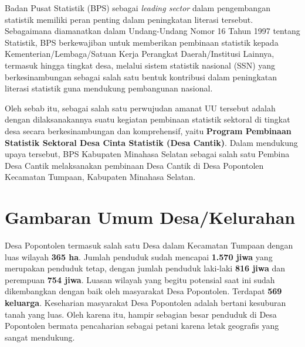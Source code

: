 Badan Pusat Statistik (BPS) sebagai \textit{leading sector} dalam pengembangan statistik memiliki peran penting dalam peningkatan literasi tersebut. Sebagaimana diamanatkan dalam Undang-Undang Nomor 16 Tahun 1997 tentang Statistik, BPS berkewajiban untuk memberikan pembinaan statistik kepada Kementerian/Lembaga/Satuan Kerja Perangkat Daerah/Institusi Lainnya, termasuk hingga tingkat desa, melalui sistem statistik nasional (SSN) yang berkesinambungan sebagai salah satu bentuk kontribusi dalam peningkatan literasi statistik guna mendukung pembangunan nasional.

Oleh sebab itu, sebagai salah satu perwujudan amanat UU tersebut adalah dengan dilaksanakannya suatu kegiatan pembinaan statistik sektoral di tingkat desa secara berkesinambungan dan komprehensif, yaitu \textbf{Program Pembinaan Statistik Sektoral Desa Cinta Statistik (Desa Cantik)}. Dalam mendukung upaya tersebut, BPS Kabupaten Minahasa Selatan sebagai salah satu Pembina Desa Cantik melaksanakan pembinaan Desa Cantik di Desa Popontolen Kecamatan Tumpaan, Kabupaten Minahasa Selatan.

\section{Gambaran Umum Desa/Kelurahan}

Desa Popontolen termasuk salah satu Desa dalam Kecamatan Tumpaan dengan luas wilayah \textbf{365 ha}. Jumlah penduduk sudah mencapai \textbf{1.570 jiwa} yang merupakan penduduk tetap, dengan jumlah penduduk laki-laki \textbf{816 jiwa} dan perempuan \textbf{754 jiwa}. Luasan wilayah yang begitu potensial saat ini sudah dikembangkan dengan baik oleh masyarakat Desa Popontolen. Terdapat \textbf{569 keluarga}. Keseharian masyarakat Desa Popontolen adalah bertani kesuburan tanah yang luas. Oleh karena itu, hampir sebagian besar penduduk di Desa Popontolen bermata pencaharian sebagai petani karena letak geografis yang sangat mendukung.

